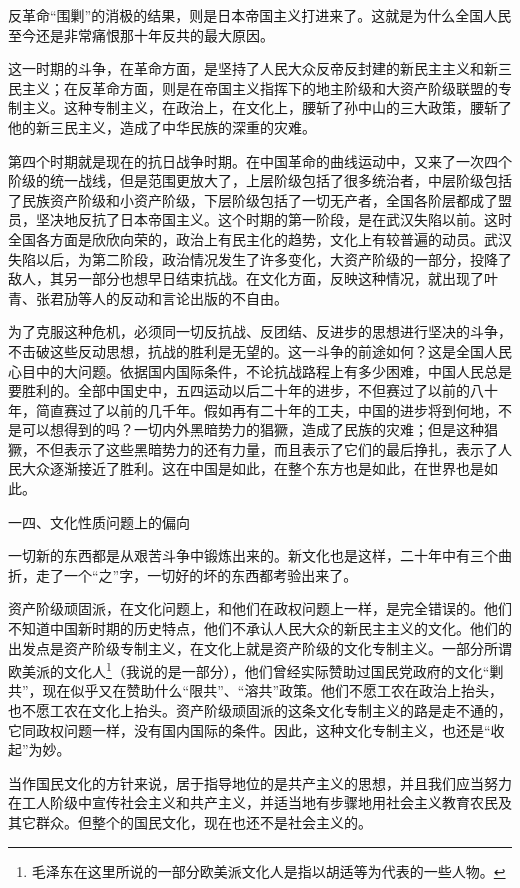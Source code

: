 \documentclass[UTF8, 12pt, a4paper]{ctexrep}
\begin{document}
反革命“围剿”的消极的结果，则是日本帝国主义打进来了。这就是为什么全国人民至今还是非常痛恨那十年反共的最大原因。

这一时期的斗争，在革命方面，是坚持了人民大众反帝反封建的新民主主义和新三民主义；在反革命方面，则是在帝国主义指挥下的地主阶级和大资产阶级联盟的专制主义。这种专制主义，在政治上，在文化上，腰斩了孙中山的三大政策，腰斩了他的新三民主义，造成了中华民族的深重的灾难。

第四个时期就是现在的抗日战争时期。在中国革命的曲线运动中，又来了一次四个阶级的统一战线，但是范围更放大了，上层阶级包括了很多统治者，中层阶级包括了民族资产阶级和小资产阶级，下层阶级包括了一切无产者，全国各阶层都成了盟员，坚决地反抗了日本帝国主义。这个时期的第一阶段，是在武汉失陷以前。这时全国各方面是欣欣向荣的，政治上有民主化的趋势，文化上有较普遍的动员。武汉失陷以后，为第二阶段，政治情况发生了许多变化，大资产阶级的一部分，投降了敌人，其另一部分也想早日结束抗战。在文化方面，反映这种情况，就出现了叶青、张君劢等人的反动和言论出版的不自由。

为了克服这种危机，必须同一切反抗战、反团结、反进步的思想进行坚决的斗争，不击破这些反动思想，抗战的胜利是无望的。这一斗争的前途如何？这是全国人民心目中的大问题。依据国内国际条件，不论抗战路程上有多少困难，中国人民总是要胜利的。全部中国史中，五四运动以后二十年的进步，不但赛过了以前的八十年，简直赛过了以前的几千年。假如再有二十年的工夫，中国的进步将到何地，不是可以想得到的吗？一切内外黑暗势力的猖獗，造成了民族的灾难；但是这种猖獗，不但表示了这些黑暗势力的还有力量，而且表示了它们的最后挣扎，表示了人民大众逐渐接近了胜利。这在中国是如此，在整个东方也是如此，在世界也是如此。

一四、文化性质问题上的偏向

一切新的东西都是从艰苦斗争中锻炼出来的。新文化也是这样，二十年中有三个曲折，走了一个“之”字，一切好的坏的东西都考验出来了。

资产阶级顽固派，在文化问题上，和他们在政权问题上一样，是完全错误的。他们不知道中国新时期的历史特点，他们不承认人民大众的新民主主义的文化。他们的出发点是资产阶级专制主义，在文化上就是资产阶级的文化专制主义。一部分所谓欧美派的文化人\footnote{毛泽东在这里所说的一部分欧美派文化人是指以胡适等为代表的一些人物。}（我说的是一部分），他们曾经实际赞助过国民党政府的文化“剿共”，现在似乎又在赞助什么“限共”、“溶共”政策。他们不愿工农在政治上抬头，也不愿工农在文化上抬头。资产阶级顽固派的这条文化专制主义的路是走不通的，它同政权问题一样，没有国内国际的条件。因此，这种文化专制主义，也还是“收起”为妙。

当作国民文化的方针来说，居于指导地位的是共产主义的思想，并且我们应当努力在工人阶级中宣传社会主义和共产主义，并适当地有步骤地用社会主义教育农民及其它群众。但整个的国民文化，现在也还不是社会主义的。
\end{document}
